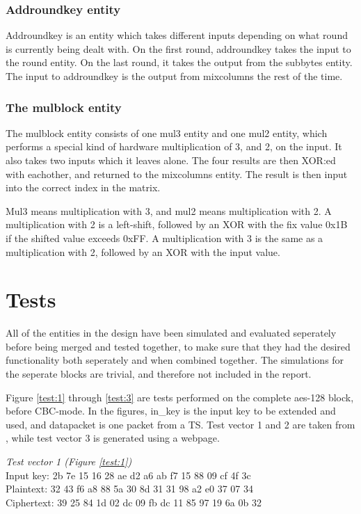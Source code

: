 \subsubsection{Addroundkey entity}
Addroundkey is an entity which takes different inputs depending on 
what round is currently being dealt with. On the first round, 
addroundkey takes the input to the round entity. On the last round, it 
takes the output from the subbytes entity. The input to addroundkey is 
the output from mixcolumns the rest of the time.

\subsubsection{The mulblock entity}
The mulblock entity consists of one mul3 entity and one mul2 entity, 
which performs a special kind of hardware multiplication of 3, and 2, 
on the input. It also takes two inputs which it leaves alone. The four 
results are then XOR:ed with eachother, and returned to the mixcolumns 
entity. The result is then input into the correct index in the matrix. 

Mul3 means multiplication with 3, and mul2 means multiplication with 2. 
A multiplication with 2 is a left-shift, followed by an XOR with the 
fix value 0x1B if the shifted value exceeds 0xFF. A multiplication with 
3 is the same as a multiplication with 2, followed by an XOR with the 
input value.

\section{Tests}
All of the entities in the design have been simulated and evaluated 
seperately before being merged and tested together, to make sure that 
they had the desired functionality both seperately and when combined 
together. The simulations for the seperate blocks are trivial, and 
therefore not included in the report.

Figure \ref{test:1} through \ref{test:3} are tests performed on the 
complete aes-128 block, before CBC-mode. In the figures, in\_key is the 
input key to be extended and used, and datapacket is one packet from a 
TS. Test vector 1 and 2 are taken from \citep{AES:2001}, while test 
vector 3 is generated using a webpage.

\emph{Test vector 1 (Figure \ref{test:1})}\\
Input key: 2b 7e 15 16 28 ae d2 a6 ab f7 15 88 09 cf 4f 3c\\
Plaintext: 32 43 f6 a8 88 5a 30 8d 31 31 98 a2 e0 37 07 34\\
Ciphertext: 39 25 84 1d 02 dc 09 fb dc 11 85 97 19 6a 0b 32

